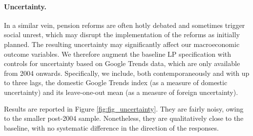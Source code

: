 \documentclass[11pt,english,a4paper, twoside, authoryear]{article}
\begin{document}

\paragraph{Uncertainty.} In a similar vein, pension reforms are often hotly debated and sometimes trigger social unrest, which may disrupt the implementation of the reforms as initially planned. The resulting uncertainty may significantly affect our macroeconomic outcome variables. We therefore augment the baseline LP specification with controls for uncertainty based on Google Trends data, which are only available from 2004 onwards. Specifically, we include, both contemporaneously and with up to three lags, the domestic Google Trends index (as a measure of domestic uncertainty) and its leave-one-out mean (as a measure of foreign uncertainty).

Results are reported in Figure \ref{fig:fig_uncertainty}. They are fairly noisy, owing to the smaller post-2004 sample. Nonetheless, they are qualitatively close to the baseline, with no systematic difference in the direction of the responses. \\












\end{document}
